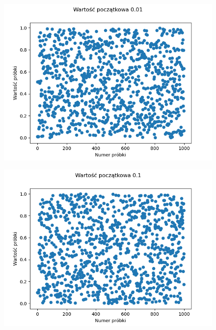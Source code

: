 \documentclass[12pt,a4paper]{article}
\begin{document}
  \begin{figure}[H]
    \centering
    \includegraphics[height=0.3\textheight]{figures/Figure_2.png}
    \label{fig:2}
  \end{figure}

  \begin{figure}[H]
    \centering
    \includegraphics[height=0.3\textheight]{figures/Figure_3.png}
    \label{fig:3}
  \end{figure}
\end{document}
